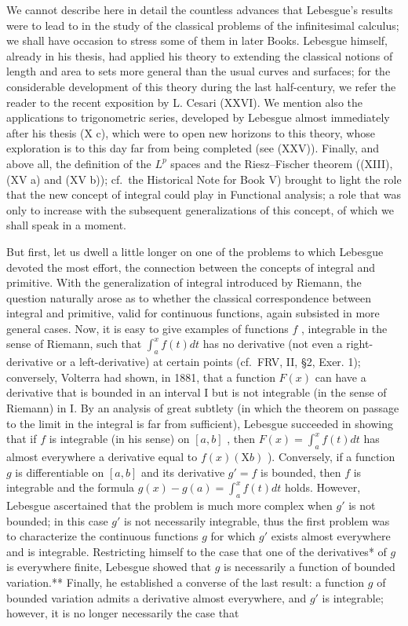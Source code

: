 We cannot describe here in detail the countless advances that Lebesgue's results were to lead to in the study of the classical problems of the infinitesimal calculus; we shall have occasion to stress some of them in later Books. Lebesgue himself, already in his thesis, had applied his theory to extending the classical notions of length and area to sets more general than the usual curves and surfaces; for the considerable development of this theory during the last half-century, we refer the reader to the recent exposition by L. Cesari (XXVI). We mention also the applications to trigonometric series, developed by Lebesgue almost immediately after his thesis (X c), which were to open new horizons to this theory, whose exploration is to this day far from being completed (see (XXV)). Finally, and above all, the definition of the \(L^{p}\) spaces and the Riesz--Fischer theorem ((XIII), (XV a) and (XV b)); cf.~the Historical Note for Book V) brought to light the role that the new concept of integral could play in Functional analysis; a role that was only to increase with the subsequent generalizations of this concept, of which we shall speak in a moment.

But first, let us dwell a little longer on one of the problems to which Lebesgue devoted the most effort, the connection between the concepts of integral and primitive. With the generalization of integral introduced by Riemann, the question naturally arose as to whether the classical correspondence between integral and primitive, valid for continuous functions, again subsisted in more general cases. Now, it is easy to give examples of functions \(f\) , integrable in the sense of Riemann, such that \(\int_{a}^{x} f(t) dt\) has no derivative (not even a right-derivative or a left-derivative) at certain points (cf.~FRV, II, §2, Exer. 1); conversely, Volterra had shown, in 1881, that a function \(F(x)\) can have a derivative that is bounded in an interval I but is not integrable (in the sense of Riemann) in I. By an analysis of great subtlety (in which the theorem on passage to the limit in the integral is far from sufficient), Lebesgue succeeded in showing that if \(f\) is integrable (in his sense) on \([a, b]\) , then \(F(x) = \int_{a}^{x} f(t) dt\) has almost everywhere a derivative equal to \(f(x) (\mathrm{X}b)\) ). Conversely, if a function \(g\) is differentiable on \([a, b]\) and its derivative \(g' = f\) is bounded, then \(f\) is integrable and the formula \(g(x) - g(a) = \int_{a}^{x} f(t) dt\) holds. However, Lebesgue ascertained that the problem is much more complex when \(g'\) is not bounded; in this case \(g'\) is not necessarily integrable, thus the first problem was to characterize the continuous functions \(g\) for which \(g'\) exists almost everywhere and is integrable. Restricting himself to the case that one of the derivatives* of \(g\) is everywhere finite, Lebesgue showed that \(g\) is necessarily a function of bounded variation.** Finally, he established a converse of the last result: a function \(g\) of bounded variation admits a derivative almost everywhere, and \(g'\) is integrable; however, it is no longer necessarily the case that

